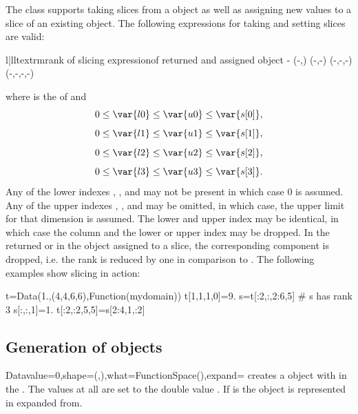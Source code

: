 The \Data class supports taking slices from a \Data object as well as assigning new values to a slice of an existing
\Data object. 
The following expressions for taking and setting slices are valid:
\begin{tableiii}{l|ll}{textrm}{rank of }{slicing expression}{\Shape of returned and assigned object}
                      {-}
                   {(-,)}
             {(-,-)}
      {(-,-,-)}
 {(-,-,-,-)}
\end{tableiii}
where  is the \Shape of  and 
\[0 \le \var{l0} \le \var{u0} \le \var{s[0]},\]
\[0 \le \var{l1} \le \var{u1} \le \var{s[1]},\] 
\[0 \le \var{l2} \le \var{u2} \le \var{s[2]},\] 
\[0 \le \var{l3} \le \var{u3} \le \var{s[3]}.\]
Any of the lower indexes , ,  and  may not be present in which case 
$0$ is assumed. 
Any of the upper indexes , ,  and  may be omitted, in which case, the upper limit for that dimension is assumed. 
The lower and upper index may be identical, in which case the column and the lower or upper
index may be dropped. In the returned or in the object assigned to a slice, the corresponding component is dropped,
i.e. the rank is reduced by one in comparison to .
The following examples show slicing in action:
\begin{python}
  t=Data(1.,(4,4,6,6),Function(mydomain))
  t[1,1,1,0]=9.
  s=t[:2,:,2:6,5] # s has rank 3
  s[:,:,1]=1.
  t[:2,:2,5,5]=s[2:4,1,:2]
\end{python}

\subsection{Generation of \Data objects}
\begin{classdesc}{Data}{value=0,shape=(,),what=FunctionSpace(),expand=\False}
creates a \Data object with \Shape {} in the \FunctionSpace {}.
The values at all \DataSamplePoints are set to the double value . If  is \True
the \Data object is represented in expanded from.
\end{classdesc}

